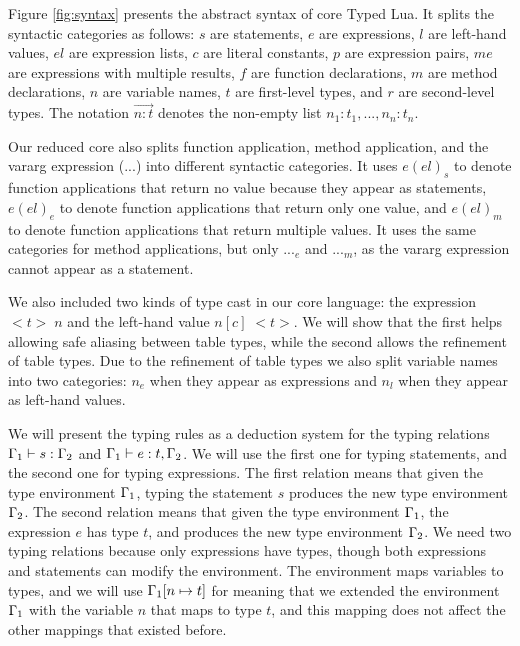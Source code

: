 Figure \ref{fig:syntax} presents the abstract syntax of core Typed Lua.
It splits the syntactic categories as follows:
$s$ are statements, $e$ are expressions, $l$ are left-hand values,
$el$ are expression lists, $c$ are literal constants, $p$ are expression pairs,
$me$ are expressions with multiple results, $f$ are function declarations,
$m$ are method declarations, $n$ are variable names,
$t$ are first-level types, and $r$ are second-level types.
The notation $\vec{n{:}t}$ denotes the non-empty list
$n_{1}{:}t_{1}, ..., n_{n}{:}t_{n}$.

Our reduced core also splits function application, method application, and
the vararg expression (${...}$) into different syntactic categories.
It uses $e(el)_{s}$ to denote function applications that return no value
because they appear as statements,
$e(el)_{e}$ to denote function applications that return only one value,
and $e(el)_{m}$ to denote function applications that return multiple values.
It uses the same categories for method applications, but only ${...}_{e}$
and ${...}_{m}$, as the vararg expression cannot appear as a statement.

We also included two kinds of type cast in our core language:
the expression ${<}t{>} \;n$ and the left-hand value $n[c] \; {<}t{>}$.
We will show that the first helps allowing safe aliasing between
table types, while the second allows the refinement of table types.
Due to the refinement of table types we also split variable names
into two categories: $n_{e}$ when they appear as expressions and
$n_{l}$ when they appear as left-hand values.

We will present the typing rules as a deduction system for the typing
relations $\Gamma_{1} \vdash s : \Gamma_{2}$ and $\Gamma_{1} \vdash e : t, \Gamma_{2}$. 
We will use the first one for typing statements, and the second one
for typing expressions.
The first relation means that given the type environment $\Gamma_{1}$,
typing the statement $s$ produces the new type environment $\Gamma_{2}$. 
The second relation means that given the type environment $\Gamma_{1}$,
the expression $e$ has type $t$, and produces the new type environment $\Gamma_{2}$.
We need two typing relations because only expressions have types,
though both expressions and statements can modify the environment.
The environment maps variables to types, and we will use $\Gamma_{1}[n \mapsto t]$
for meaning that we extended the environment $\Gamma_{1}$ with the
variable $n$ that maps to type $t$, and this mapping does not affect
the other mappings that existed before.

